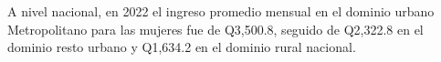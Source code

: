 A nivel nacional, en 2022 el ingreso promedio mensual en el dominio urbano Metropolitano para las mujeres fue de Q3,500.8, seguido de Q2,322.8 en el dominio resto urbano y Q1,634.2 en el dominio rural nacional. 